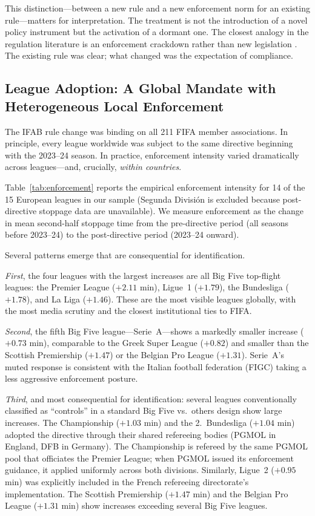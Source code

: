 \documentclass[12pt]{article}
\begin{document}
This distinction---between a new rule and a new enforcement norm for an existing rule---matters for interpretation. The treatment is not the introduction of a novel policy instrument but the activation of a dormant one. The closest analogy in the regulation literature is an enforcement crackdown rather than new legislation \citep{johnson2020compliance, greenstone2004did}. The existing rule was clear; what changed was the expectation of compliance.

\subsection{League Adoption: A Global Mandate with Heterogeneous Local Enforcement}

The IFAB rule change was binding on all 211 FIFA member associations. In principle, every league worldwide was subject to the same directive beginning with the 2023--24 season. In practice, enforcement intensity varied dramatically across leagues---and, crucially, \textit{within countries}.

Table~\ref{tab:enforcement} reports the empirical enforcement intensity for 14 of the 15 European leagues in our sample (Segunda Divisi\'{o}n is excluded because post-directive stoppage data are unavailable). We measure enforcement as the change in mean second-half stoppage time from the pre-directive period (all seasons before 2023--24) to the post-directive period (2023--24 onward).



Several patterns emerge that are consequential for identification.

\textit{First}, the four leagues with the largest increases are all Big Five top-flight leagues: the Premier League ($+2.11$ min), Ligue~1 ($+1.79$), the Bundesliga ($+1.78$), and La Liga ($+1.46$). These are the most visible leagues globally, with the most media scrutiny and the closest institutional ties to FIFA.

\textit{Second}, the fifth Big Five league---Serie~A---shows a markedly smaller increase ($+0.73$ min), comparable to the Greek Super League ($+0.82$) and smaller than the Scottish Premiership ($+1.47$) or the Belgian Pro League ($+1.31$). Serie~A's muted response is consistent with the Italian football federation (FIGC) taking a less aggressive enforcement posture.

\textit{Third}, and most consequential for identification: several leagues conventionally classified as ``controls'' in a standard Big Five vs.\ others design show large increases. The Championship ($+1.03$ min) and the 2.~Bundesliga ($+1.04$ min) adopted the directive through their shared refereeing bodies (PGMOL in England, DFB in Germany). The Championship is refereed by the same PGMOL pool that officiates the Premier League; when PGMOL issued its enforcement guidance, it applied uniformly across both divisions. Similarly, Ligue~2 ($+0.95$ min) was explicitly included in the French refereeing directorate's implementation. The Scottish Premiership ($+1.47$ min) and the Belgian Pro League ($+1.31$ min) show increases exceeding several Big Five leagues.
\end{document}
